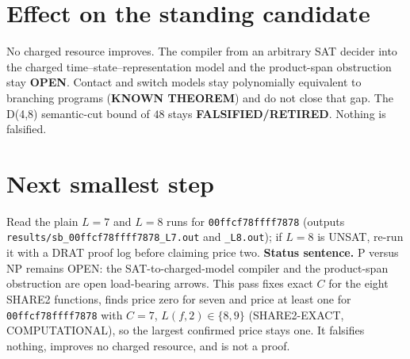 \documentclass[11pt]{article}
\begin{document}
\section*{Effect on the standing candidate}
No charged resource improves. The compiler from an arbitrary SAT decider into the charged time--state--representation model and the product-span obstruction stay \textbf{OPEN}. Contact and switch models stay polynomially equivalent to branching programs (\textbf{KNOWN THEOREM}) and do not close that gap. The D(4,8) semantic-cut bound of $48$ stays \textbf{FALSIFIED/RETIRED}. Nothing is falsified.
\section*{Next smallest step}
Read the plain $L=7$ and $L=8$ runs for \texttt{00ffcf78ffff7878} (outputs \texttt{results/sb\_00ffcf78ffff7878\_L7.out} and \texttt{\_L8.out}); if $L=8$ is UNSAT, re-run it with a DRAT proof log before claiming price two.
\bigskip
\noindent\textbf{Status sentence.} P versus NP remains OPEN: the SAT-to-charged-model compiler and the product-span obstruction are open load-bearing arrows. This pass fixes exact $C$ for the eight SHARE2 functions, finds price zero for seven and price at least one for \texttt{00ffcf78ffff7878} with $C=7$, $L(f,2)\in\{8,9\}$ (SHARE2-EXACT, COMPUTATIONAL), so the largest confirmed price stays one. It falsifies nothing, improves no charged resource, and is not a proof.
\end{document}
